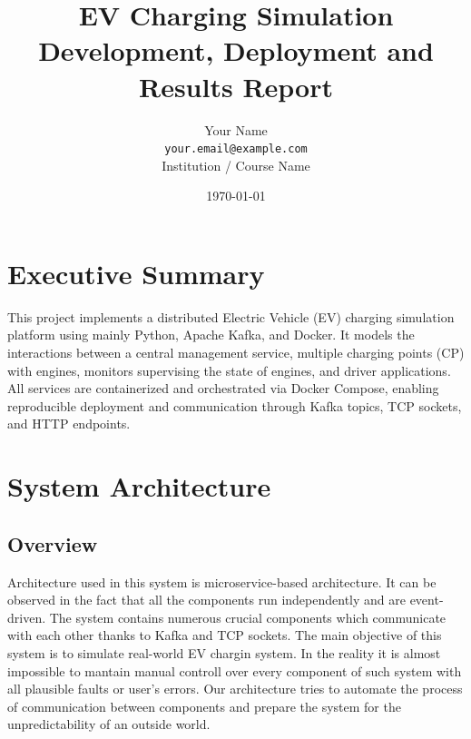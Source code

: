 \documentclass[12pt,a4paper]{article}
\title{
    \vspace{3cm}
    \textbf{EV Charging Simulation}\\
    \large Development, Deployment and Results Report\\
    \vspace{1cm}
}
\author{
    Your Name\\
    \texttt{your.email@example.com}\\
    Institution / Course Name
}
\date{\today}
\begin{document}
\maketitle
\newpage
\tableofcontents
\newpage

\section{Executive Summary}
This project implements a distributed Electric Vehicle (EV) charging simulation platform using mainly 
Python, Apache Kafka, and Docker.
It models the interactions between a central management service, multiple charging points (CP) with engines, monitors supervising the state of engines,
and driver applications.
All services are containerized and orchestrated via Docker Compose, 
enabling reproducible deployment and communication through Kafka topics, TCP sockets, and HTTP endpoints.

\section{System Architecture}

\subsection{Overview}
Architecture used in this system is microservice-based architecture. 
It can be observed in the fact that all the components run independently and are event-driven.
The system contains numerous crucial components which communicate with each other thanks to Kafka and TCP sockets.
The main objective of this system is to simulate real-world EV chargin system.
In the reality it is almost impossible to mantain manual controll over every component of such system
with all plausible faults or user's errors.
Our architecture tries to automate the process of communication between components and prepare the system
for the unpredictability of an outside world.
\end{document}
